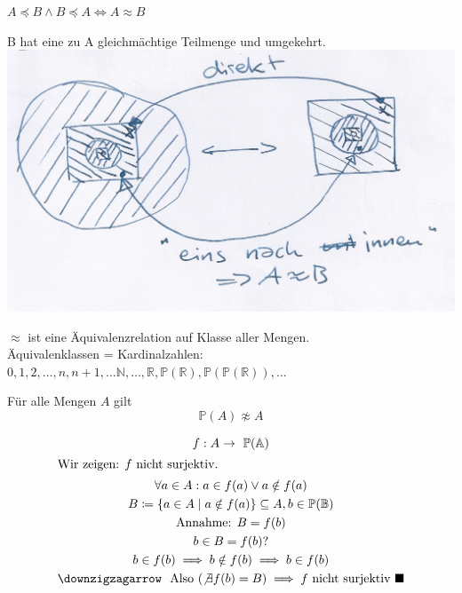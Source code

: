\begin{satz*}[note = {(Schnöder, Bernstein, Cantor)}]
	$A \preceq B \wedge B \preceq A \iff A \approx B$\\
	\begin{bew}[note = \enquote{Beweis}:]
		B hat eine zu A gleichmächtige Teilmenge und umgekehrt.\\
		\includegraphics[width=\textwidth]{Bild24}
	\end{bew}
\end{satz*}
\begin{def*}[note = Gleichmächtigkeit , index = Gleichmächtigkeit]
	$\approx$ ist eine Äquivalenzrelation auf Klasse aller Mengen.\\
	Äquivalenklassen = Kardinalzahlen:\\
	$0, 1, 2, \dotsc , n, n+1, \dotsc \mathbb{N}, \dotsc , \mathbb{R}, \mathbb{P}(\mathbb{R}), \mathbb{P}(\mathbb{P}(\mathbb{R})), \dotsc$
\end{def*}
\begin{satz*}[note = (Cantor)]
	Für alle Mengen $A$ gilt\\
	\[ \mathbb{P}(A) \not\approx A \]
	\begin{bew}
		\begin{gather*}
			f: A \rightarrow \mathbb{P}(\mathbb{A}) \\
			\intertext{Wir zeigen: $f$ nicht surjektiv.}
			\forall a \in A : a \in f(a) \vee a \notin f(a) \\
			B \coloneqq \{ a \in A \mid a \notin f(a) \} \subseteq A, b \in \mathbb{P}(\mathbb{B}) \\
			\text{Annahme: } B = f(b) \\
				b \in B = f(b) ? \\
				b \in f(b) \implies b\notin f(b) \implies b \in f(b) \\
				\text{\lightning ~ Also } ( \not\exists f(b) = B ) \implies f \text{ nicht surjektiv } \blacksquare
		\end{gather*}
	\end{bew}
\end{satz*}
